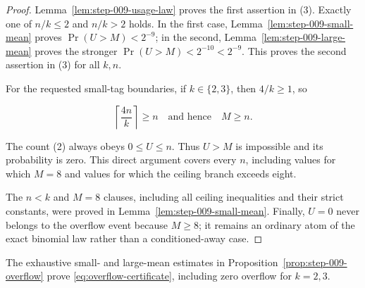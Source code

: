 \begin{proof}
Lemma~\ref{lem:step-009-usage-law} proves the first assertion in (3).
Exactly one of \(n/k\le2\) and \(n/k>2\) holds. In the first case,
Lemma~\ref{lem:step-009-small-mean} proves
\(\Pr(U>M)<2^{-9}\); in the second,
Lemma~\ref{lem:step-009-large-mean} proves the stronger
\(\Pr(U>M)<2^{-10}<2^{-9}\). This proves the second assertion in (3)
for all \(k,n\).

For the requested small-tag boundaries, if \(k\in\{2,3\}\), then
\(4/k\ge1\), so

\[
\left\lceil\frac{4n}{k}\right\rceil\ge n
\quad\text{and hence}\quad M\ge n.
\tag{26}
\]

The count (2) always obeys \(0\le U\le n\). Thus \(U>M\) is impossible
and its probability is zero. This direct argument covers every \(n\),
including values for which \(M=8\) and values for which the ceiling branch
exceeds eight.

The \(n<k\) and \(M=8\) clauses, including all ceiling inequalities and
their strict constants, were proved in
Lemma~\ref{lem:step-009-small-mean}. Finally, \(U=0\) never belongs to the
overflow event because \(M\ge8\); it remains an ordinary atom of the exact
binomial law rather than a conditioned-away case. \end{proof}
The exhaustive small- and large-mean estimates in
Proposition~\ref{prop:step-009-overflow} prove
\eqref{eq:overflow-certificate}, including zero overflow for $k=2,3$.

